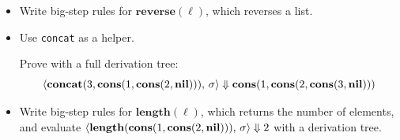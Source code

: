 \begin{itemize}
	\item Write big-step rules for $\mathbf{reverse}(\ell)$, which reverses a list.
	\item Use \texttt{concat} as a helper.

	Prove with a full derivation tree:
\[
\langle \mathbf{concat}(3,\mathbf{cons}(1,\mathbf{cons}(2,\mathbf{nil}))),\, \sigma \rangle \Downarrow \mathbf{cons}(1,\mathbf{cons}(2,\mathbf{cons}(3,\mathbf{nil})))
\]

	\item Write big-step rules for $\mathbf{length}(\ell)$, which returns the number of
elements, and evaluate $\langle \mathbf{length}(\mathbf{cons}(1,\mathbf{cons}(2,\mathbf{nil}))),\, \sigma \rangle \Downarrow 2$
with a derivation tree.
\end{itemize}

